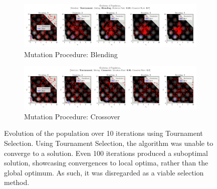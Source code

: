 \documentclass[10pt]{article}
\begin{document}
\begin{figure}[H]
    \centering
    \begin{subfigure}{\textwidth}
        \centering
        \includegraphics[width=\textwidth]{../figures/KBF/10_iters/Tournament/Blending/0.05_0.7_Population.png}
        \caption{Mutation Procedure: Blending}
        \label{fig:CGA_flowchart_tournament_blending}
    \end{subfigure}
    \begin{subfigure}{\textwidth}
        \centering
        \includegraphics[width=\textwidth]{../figures/KBF/10_iters/Tournament/Crossover/0.05_0.7_Population.png}
        \caption{Mutation Procedure: Crossover}
        \label{fig:CGA_flowchart_tournament_crossover}
    \end{subfigure}
    \captionsetup{justification=centering}
    \caption{Evolution of the population over 10 iterations using Tournament Selection. Using Tournament Selection, the algorithm was unable to converge to a solution. Even 100 iterations produced a suboptimal solution, showcasing convergences to local optima, rather than the global optimum. As such, it was disregarded as a viable selection method.}
    \label{fig:CGA_flowchart_tournament}
\end{figure}
\end{document}
